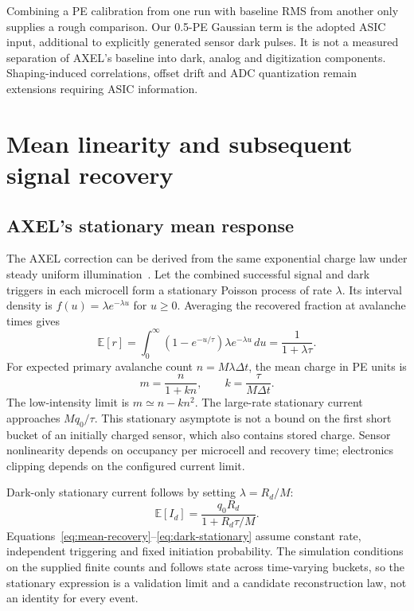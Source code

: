 \documentclass[11pt]{article}
\newcommand{\E}{\mathbb{E}}
\begin{document}
Combining a PE calibration from one run with baseline RMS from another only
supplies a rough comparison. Our 0.5-PE Gaussian term is the adopted ASIC
input, additional to explicitly generated sensor dark pulses. It is not a
measured separation of AXEL's baseline into dark, analog and digitization
components. Shaping-induced correlations, offset drift and ADC quantization
remain extensions requiring ASIC information.

\section{Mean linearity and subsequent signal recovery}
\subsection{AXEL's stationary mean response}
The AXEL correction can be derived from the same exponential charge law
under steady uniform illumination~\cite{Ban2020AXELPrototype}. Let the
combined successful signal and dark triggers in each microcell form a
stationary Poisson process of rate $\lambda$. Its interval density is
$f(u)=\lambda e^{-\lambda u}$ for $u\geq0$. Averaging the recovered fraction
at avalanche times gives
\begin{equation}
 \E[r]=\int_0^\infty(1-e^{-u/\tau})\lambda e^{-\lambda u}\,du
       =\frac{1}{1+\lambda\tau}.
 \label{eq:mean-recovery}
\end{equation}
For expected primary avalanche count $n=M\lambda\Delta t$, the mean charge
in PE units is
\begin{equation}
 m=\frac{n}{1+kn},\qquad k=\frac{\tau}{M\Delta t}.
 \label{eq:forward-mean}
\end{equation}
The low-intensity limit is $m\simeq n-kn^2$. The large-rate stationary
current approaches $Mq_0/\tau$. This stationary asymptote is not a bound on
the first short bucket of an initially charged sensor, which also contains
stored charge. Sensor nonlinearity depends on occupancy per microcell and
recovery time; electronics clipping depends on the configured current limit.

Dark-only stationary current follows by setting $\lambda=R_d/M$:
\begin{equation}
 \E[I_d]=\frac{q_0R_d}{1+R_d\tau/M}.
 \label{eq:dark-stationary}
\end{equation}
Equations~\eqref{eq:mean-recovery}--\eqref{eq:dark-stationary} assume constant
rate, independent triggering and fixed initiation probability. The simulation
conditions on the supplied finite counts and follows state across time-varying
buckets, so the stationary expression is a validation limit and a candidate
reconstruction law, not an identity for every event.
\end{document}
